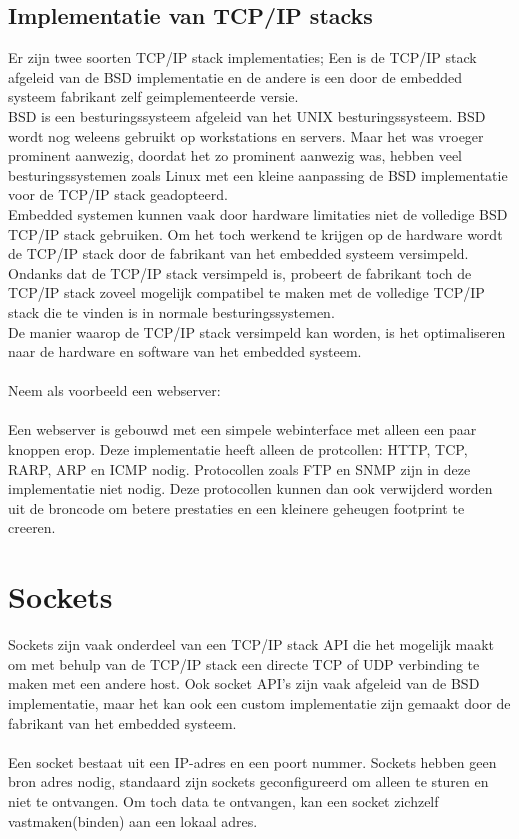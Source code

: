 \documentclass[../DCM2_Verslag.tex]{subfiles}
\begin{document}
\subsection{Implementatie van TCP/IP stacks}
Er zijn twee soorten TCP/IP stack implementaties; Een is de TCP/IP stack afgeleid van de BSD implementatie en de andere is een door de embedded systeem fabrikant zelf geimplementeerde versie.\\
BSD is een besturingssysteem afgeleid van het UNIX besturingssysteem. BSD wordt nog weleens gebruikt op workstations en servers. Maar het was vroeger prominent aanwezig, doordat het zo prominent aanwezig was, hebben veel besturingssystemen zoals Linux met een kleine aanpassing de BSD implementatie voor de TCP/IP stack geadopteerd.
\\
Embedded systemen kunnen vaak door hardware limitaties niet de volledige BSD TCP/IP stack gebruiken. Om het toch werkend te krijgen op de hardware wordt de TCP/IP stack door de fabrikant van het embedded systeem versimpeld. Ondanks dat de TCP/IP stack versimpeld is, probeert de fabrikant toch de TCP/IP stack zoveel mogelijk compatibel te maken met de volledige TCP/IP stack die te vinden is in normale besturingssystemen. 
\\
De manier waarop de TCP/IP stack versimpeld kan worden, is het optimaliseren naar de hardware en software van het embedded systeem.
\\\\
Neem als voorbeeld een webserver:
\\\\
Een webserver is gebouwd met een simpele webinterface met alleen een paar knoppen erop. Deze implementatie heeft alleen de protcollen: HTTP, TCP, RARP, ARP en ICMP nodig. Protocollen zoals FTP en SNMP zijn in deze implementatie niet nodig. Deze protocollen kunnen dan ook verwijderd worden uit de broncode om betere prestaties en een kleinere geheugen footprint te creeren.


\section{Sockets}
Sockets zijn vaak onderdeel van een TCP/IP stack API die het mogelijk maakt om met behulp van de TCP/IP stack een directe TCP of UDP verbinding te maken met een andere host. Ook socket API's zijn vaak afgeleid van de BSD implementatie, maar het kan ook een custom implementatie zijn gemaakt door de fabrikant van het embedded systeem. 
\\\\
Een socket bestaat uit een IP-adres en een poort nummer. Sockets hebben geen bron adres nodig, standaard zijn sockets geconfigureerd om alleen te sturen en niet te ontvangen. Om toch data te ontvangen, kan een socket zichzelf vastmaken(binden) aan een lokaal adres.
\end{document}
